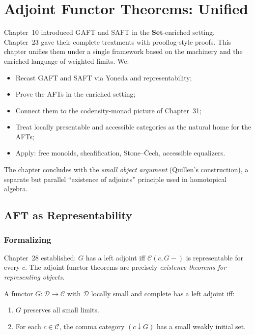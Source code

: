 
\chapter{Adjoint Functor Theorems: Unified}

\begin{overviewbox}
Chapter~10 introduced GAFT and SAFT in the $\mathbf{Set}$-enriched setting.
Chapter~23 gave their complete treatments with prooflog-style proofs.
This chapter unifies them under a single framework based on the
 machinery and the
enriched language of weighted limits. We:
\begin{itemize}
  \item Recast GAFT and SAFT via Yoneda and representability;
  \item Prove the AFTs in the enriched setting;
  \item Connect them to the codensity-monad picture of Chapter~31;
  \item Treat locally presentable and accessible categories as the natural
        home for the AFTs;
  \item Apply: free monoids, sheafification, Stone--\v Cech, accessible
        equalizers.
\end{itemize}
The chapter concludes with the \emph{small object argument} (Quillen's
construction), a separate but parallel ``existence of adjoints'' principle
used in homotopical algebra.
\end{overviewbox}


\section{AFT as Representability}
\label{sec:aft-rep}

\subsection{Formalizing}

Chapter~28 established: $G$ has a left adjoint iff $\mathcal{C}(c, G-)$ is
representable for every $c$. The adjoint functor theorems are precisely
\emph{existence theorems for representing objects}.

\begin{theorem}
\label{thm:gaft-yoneda}
A functor $G : \mathcal{D} \to \mathcal{C}$ with $\mathcal{D}$ locally small
and complete has a left adjoint iff:
\begin{enumerate}
  \item $G$ preserves all small limits.
  \item For each $c \in \mathcal{C}$, the comma category $(c \downarrow G)$
        has a small weakly initial set.
\end{enumerate}
\end{theorem}

